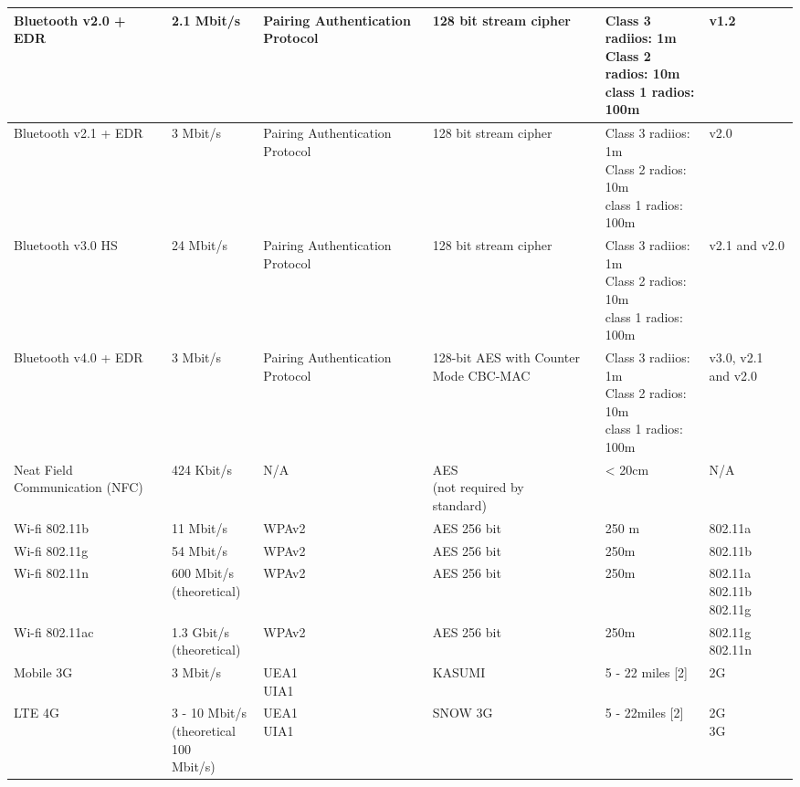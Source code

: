 \documentclass[a4paper]{report}
\begin{document}
{\begin{landscape}
\begin{table}[h]
\begin{tabular}{ | m{3cm} | m{3cm} | m{3.5cm} | m{3cm} | m{3cm} | m{2.5cm} |}
   Bluetooth v2.0 + EDR & 2.1 Mbit/s & Pairing Authentication Protocol & 128 bit stream cipher & \pbox{20cm}{Class 3 radiios: 1m \\Class 2 radios: 10m \\class 1 radios: 100m} & v1.2  \\ \hline
   Bluetooth v2.1 + EDR & 3 Mbit/s & Pairing Authentication Protocol & 128 bit stream cipher & \pbox{20cm}{Class 3 radiios: 1m \\Class 2 radios: 10m \\class 1 radios: 100m} & v2.0 \\ \hline
   Bluetooth v3.0 HS & 24 Mbit/s & Pairing Authentication Protocol & 128 bit stream cipher & \pbox{20cm}{Class 3 radiios: 1m \\Class 2 radios: 10m \\class 1 radios: 100m} &  v2.1 and v2.0\\ \hline
   Bluetooth v4.0 + EDR & 3 Mbit/s &Pairing Authentication Protocol & 128-bit AES with Counter Mode CBC-MAC & \pbox{20cm}{Class 3 radiios: 1m \\Class 2 radios: 10m \\class 1 radios: 100m} & v3.0, v2.1 and v2.0 \\ \hline
   Neat Field Communication (NFC) & 424 Kbit/s & N/A & \pbox{20cm}{AES \\(not required by \\standard)} & < 20cm & N/A \\ \hline
   Wi-fi 802.11b & 11 Mbit/s & WPAv2 & AES 256 bit & 250 m & 802.11a\\ \hline
   Wi-fi 802.11g & 54 Mbit/s & WPAv2 & AES 256 bit & 250m & 802.11b \\ \hline
   Wi-fi 802.11n & \pbox{20cm}{600 Mbit/s \\(theoretical)} & WPAv2 & AES 256 bit & 250m & \pbox{20cm}{802.11a  \\802.11b \\802.11g} \\ \hline
   Wi-fi 802.11ac &  \pbox{20cm}{1.3 Gbit/s \\(theoretical)} & WPAv2 & AES 256 bit  & 250m & \pbox{20cm}{802.11g \\802.11n} \\ \hline
   Mobile 3G & 3 Mbit/s & \pbox{20cm}{UEA1 \\UIA1} & KASUMI & 5 - 22 miles [2] & 2G \\ \hline
   LTE 4G & \pbox{20cm}{3 - 10 Mbit/s \\(theoretical 100 \\Mbit/s)} & \pbox{20cm}{UEA1 \\UIA1} & SNOW 3G & 5 - 22miles [2] & \pbox{20cm}{2G \\3G}  \\ \hline
   

\end{tabular}
\end{table}
\end{landscape}}
\end{document}
